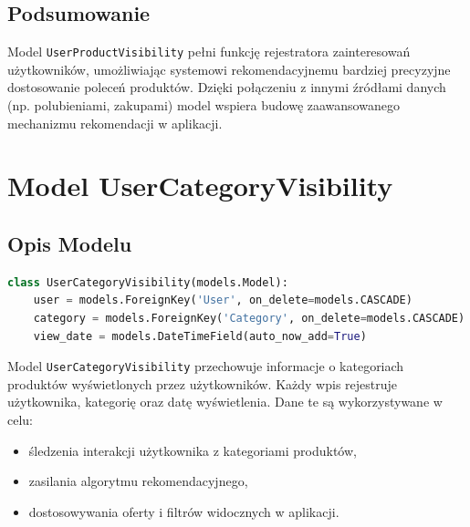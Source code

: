 \documentclass[12pt,a4paper,oneside]{article}
\theoremstyle{definition}
\numberwithin{equation}{section}
\begin{document}
\subsection{Podsumowanie}
Model \texttt{UserProductVisibility} pełni funkcję rejestratora zainteresowań użytkowników, umożliwiając systemowi rekomendacyjnemu bardziej precyzyjne dostosowanie poleceń produktów. Dzięki połączeniu z innymi źródłami danych (np. polubieniami, zakupami) model wspiera budowę zaawansowanego mechanizmu rekomendacji w aplikacji.


% 
% 


\section{Model UserCategoryVisibility}

\subsection{Opis Modelu}
\begin{lstlisting}[language=Python]
class UserCategoryVisibility(models.Model):
    user = models.ForeignKey('User', on_delete=models.CASCADE)
    category = models.ForeignKey('Category', on_delete=models.CASCADE)
    view_date = models.DateTimeField(auto_now_add=True)
\end{lstlisting}

Model \texttt{UserCategoryVisibility} przechowuje informacje o kategoriach produktów wyświetlonych przez użytkowników. Każdy wpis rejestruje użytkownika, kategorię oraz datę wyświetlenia. Dane te są wykorzystywane w celu:
\begin{itemize}
    \item śledzenia interakcji użytkownika z kategoriami produktów,
    \item zasilania algorytmu rekomendacyjnego,
    \item dostosowywania oferty i filtrów widocznych w aplikacji.
\end{itemize}
\end{document}
